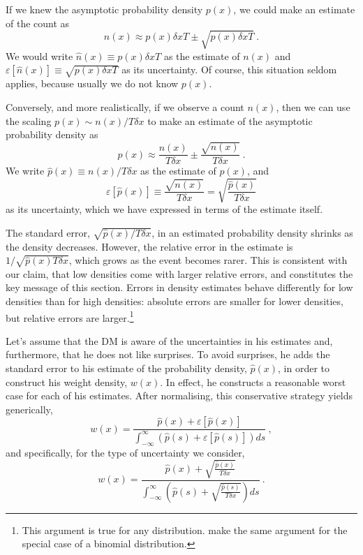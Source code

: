 \documentclass[a4paper, 12pt]{article}
\newcommand{\elabel}[1]{\label{eq:#1}}
\newcommand{\be}{\begin{equation}}
\newcommand{\ee}{\end{equation}}
\newcommand{\err}[1]{\varepsilon\left[#1\right]}
\newcommand{\phat}{\hat{p}}
\newcommand{\nhat}{\hat{n}}
\begin{document}
If we knew the asymptotic probability density $p(x)$, we could make an estimate of the count as
\be
n(x) \approx p(x) \delta x T \pm \sqrt{p(x) \delta x T} ~.
\elabel{count_est}
\ee
We would write $\nhat(x) \equiv p(x) \delta x T$ as the estimate of $n(x)$ and $\err{\nhat(x)} \equiv \sqrt{p(x) \delta x T}$ as its uncertainty. Of course, this situation seldom applies, because usually we do not know $p(x)$.

Conversely, and more realistically, if we observe a count $n(x)$, then we can use the scaling $ p(x) \sim n(x)/T\delta x$ to make an estimate of the asymptotic probability density as
\be
p(x) \approx \frac{n(x)}{T\delta x} \pm \frac{\sqrt{n(x)}}{T \delta x} ~.
\elabel{prob_est}
\ee
We write $\phat(x) \equiv n(x)/T\delta x$ as the estimate of $p(x)$, and
\be
\err{\phat(x)} \equiv \frac{\sqrt{n(x)}}{T \delta x} = \sqrt{\frac{\phat(x)}{T \delta x}}
\ee
as its uncertainty, which we have expressed in terms of the estimate itself.

The standard error, $ \sqrt{\phat(x)/T \delta x}$, in an estimated probability density shrinks as the density decreases. However, the relative error in the estimate is $1/\sqrt{\phat(x)T\delta x}$, which grows as the event becomes rarer. This is consistent with our claim, that low densities come with larger relative errors, and constitutes the key message of this section. Errors in density estimates behave differently for low densities than for high densities: absolute errors are smaller for lower densities, but relative errors are larger.\footnote{This argument is true for any distribution. \textcite[537-8]{HertwigETAL2004} make the same argument for the special case of a binomial distribution.}

Let's assume that the DM is aware of the uncertainties in his estimates and, furthermore, that he does not like surprises. To avoid surprises, he adds the standard error to his estimate of the probability density, $\phat(x)$, in order to construct his weight density, $w(x)$. In effect, he constructs a reasonable worst case for each of his estimates. After normalising, this conservative strategy yields generically,
\be
w(x) = \frac{\phat(x)+\err{\phat(x)}}{\int_{-\infty}^{\infty}\left(\phat(s)+\err{\phat(s)}\right)ds}~,
\elabel{weight_density_gen}
\ee
and specifically, for the type of uncertainty we consider,
\be
w(x)= \frac{\phat(x)+\sqrt{\frac{\phat(x)}{T \delta x}}}{\int_{-\infty}^{\infty}\left(\phat(s)+\sqrt{\frac{\phat(s)}{T \delta x}}\right)ds}~.
\elabel{weight_density_spec}
\ee
\end{document}

